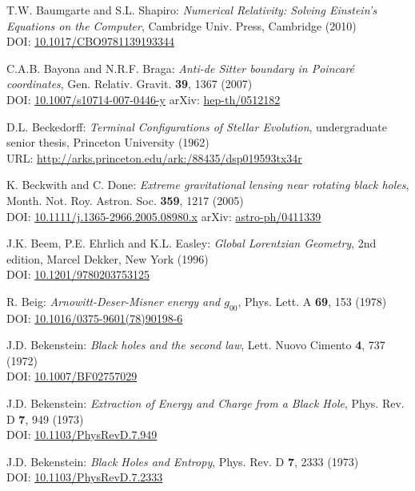 \begin{thebibliography}{123}
T.W. Baumgarte and S.L. Shapiro:
{\em Numerical Relativity: Solving Einstein's Equations on the Computer},
Cambridge Univ. Press, Cambridge (2010)\\
DOI: \href{https://doi.org/10.1017/CBO9781139193344}{10.1017/CBO9781139193344}

C.A.B. Bayona and N.R.F. Braga:
{\em Anti-de Sitter boundary in Poincaré coordinates},
Gen. Relativ. Gravit. {\bf 39}, 1367 (2007)\\
DOI: \href{https://doi.org/10.1007/s10714-007-0446-y}{10.1007/s10714-007-0446-y}\hfill
arXiv: \href{https://arxiv.org/abs/hep-th/0512182}{hep-th/0512182}

D.L. Beckedorff:
{\em Terminal Configurations of Stellar Evolution},
undergraduate senior thesis, Princeton University (1962)\\
URL: \url{http://arks.princeton.edu/ark:/88435/dsp019593tx34r}

K. Beckwith and C. Done:
{\em Extreme gravitational lensing near rotating black holes},
Month. Not. Roy. Astron. Soc. {\bf 359}, 1217 (2005)\\
DOI: \href{https://doi.org/10.1111/j.1365-2966.2005.08980.x}{10.1111/j.1365-2966.2005.08980.x}\hfill
arXiv: \href{https://arxiv.org/abs/astro-ph/0411339}{astro-ph/0411339}

J.K. Beem, P.E. Ehrlich and K.L. Easley:
{\em Global Lorentzian Geometry}, 2nd edition,
Marcel Dekker, New York (1996)\\
DOI: \href{https://doi.org/10.1201/9780203753125}{10.1201/9780203753125}

R. Beig:
{\em Arnowitt-Deser-Misner energy and $g_{00}$},
Phys. Lett. A {\bf 69}, 153 (1978)\\
DOI: \href{https://doi.org/10.1016/0375-9601(78)90198-6}{10.1016/0375-9601(78)90198-6}

J.D. Bekenstein:
{\em Black holes and the second law},
Lett. Nuovo Cimento {\bf 4}, 737 (1972)\\
DOI: \href{https://doi.org/10.1007/BF02757029}{10.1007/BF02757029}

J.D. Bekenstein:
{\em Extraction of Energy and Charge from a Black Hole},
Phys. Rev. D {\bf 7}, 949 (1973)\\
DOI: \href{https://doi.org/10.1103/PhysRevD.7.949}{10.1103/PhysRevD.7.949}

J.D. Bekenstein:
{\em Black Holes and Entropy},
Phys. Rev. D {\bf 7}, 2333 (1973)\\
DOI: \href{https://doi.org/10.1103/PhysRevD.7.2333}{10.1103/PhysRevD.7.2333}


\end{thebibliography}
